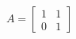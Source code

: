 \documentclass[preview]{standalone}
\begin{document}
\begin{align*}
A=\begin{bmatrix}1&1\\0&1\end{bmatrix}
\end{align*}
\end{document}
